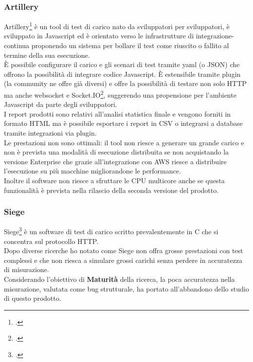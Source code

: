 \subsubsection{Artillery}
Artillery\footcite{site:artillery} è un tool di test di carico nato da sviluppatori per sviluppatori, è sviluppato in Javascript ed è orientato verso le infrastrutture di \gls{integrazione-continua} proponendo un sistema per bollare il test come riuscito o fallito al termine della sua esecuzione. \\
È possibile configurare il carico e gli scenari di test tramite \gls{yaml} (o JSON) che offrono la possibilità di integrare codice Javascript.
È estensibile tramite \gls{plugin} (la community ne offre già diversi) e offre la possibilità di testare non solo HTTP ma anche \gls{websocket} e Socket.IO\footcite{site:socketio}, suggerendo una propensione per l'ambiente Javascript da parte degli sviluppatori. \\
I report prodotti sono relativi all'analisi statistica finale e vengono forniti in formato HTML ma è possibile esportare i report in CSV o integrarsi a database tramite integrazioni via \gls{plugin}. \\
Le prestazioni non sono ottimali: il tool non riesce a generare un grande carico e non è prevista una modalità di esecuzione distribuita se non acquistando la versione Enterprise che grazie all'integrazione con AWS riesce a distribuire l'esecuzione su più macchine migliorandone le performance. \\
Inoltre il software non riesce a sfruttare le CPU multicore anche se questa funzionalità è prevista nella rilascio della seconda versione del prodotto.
\subsubsection{Siege}
Siege\footcite{site:siege} è un software di test di carico scritto prevalentemente in C che si concentra sul protocollo HTTP.\\
Dopo diverse ricerche ho notato come Siege non offra grosse prestazioni con test complessi e che non riesca a simulare grossi carichi senza perdere in accuratezza di misurazione.\\
Considerando l'obiettivo di \textbf{Maturità} della ricerca, la poca accuratezza nella misurazione, valutata come bug strutturale, ha portato all'abbandono dello studio di questo prodotto.
